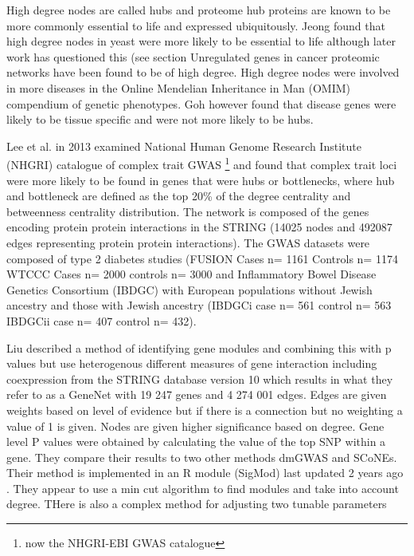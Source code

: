  High degree nodes are called hubs and proteome hub proteins are known to be more commonly essential to life \cite{jeong2001lethality} and expressed ubiquitously. \cite{goh2007human}  Jeong found that high degree nodes in yeast were more likely to be essential to life \cite{jeong2001lethality} although later work has questioned this (see section Unregulated genes in cancer proteomic networks have been found to be of high degree. \cite{wachi2005interactome}  High degree nodes were  involved in more diseases in the Online Mendelian Inheritance in Man (OMIM) compendium of genetic phenotypes. \cite{xu2006discovering}  Goh however found that disease genes were likely to be tissue specific and were not more likely to be hubs. \cite{goh2007human}  

Lee et al. \cite{lee2013network} in 2013 examined National Human Genome Research Institute (NHGRI)  catalogue of complex trait GWAS \footnote{now the NHGRI-EBI GWAS catalogue} and found that complex trait loci were more likely to be found in genes that were hubs or bottlenecks, where hub and bottleneck are defined as the top 20\% of the degree centrality and betweenness centrality distribution.  The network is composed of the genes encoding protein protein interactions in the STRING (14025 nodes and 492087 edges representing protein protein interactions). The GWAS datasets were composed of type 2 diabetes studies (FUSION  Cases n=	1161 Controls n=	1174 
WTCCC Cases n=	2000 controls n=	3000  and Inflammatory Bowel Disease Genetics Consortium (IBDGC) with European populations without Jewish ancestry and those with Jewish ancestry (IBDGCi case n=	561 control n=	563 IBDGCii case n= 	407 control n=	432).  

Liu \cite{liu2017sigmod} described a method of identifying gene modules and combining this with p values but use heterogenous different measures of gene interaction including coexpression from the STRING database version 10 which results in what they refer to as a GeneNet  with 19 247 genes and 4 274 001 edges. Edges are given weights based on level of evidence but if there is a connection but no weighting a value of 1 is given. Nodes are given higher significance based on degree.  Gene level P values were obtained by calculating the value of the top SNP within a gene. They compare their results to two other methods dmGWAS and SCoNEs. Their method is implemented in an R module (SigMod) last updated 2 years ago . They appear to use a min cut algorithm to find modules and take into account degree. THere is also a complex method for adjusting two tunable parameters 



